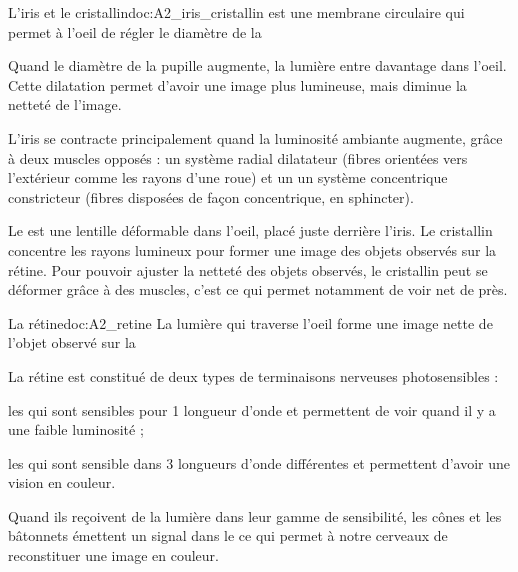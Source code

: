 


\begin{doc}{L'iris et le cristallin}{doc:A2_iris_cristallin}
   est une membrane circulaire qui permet à l'oeil de régler le diamètre de la  
  
  Quand le diamètre de la pupille augmente, la lumière entre davantage dans l'oeil.
  Cette dilatation permet d'avoir une image plus lumineuse, mais diminue la netteté de l'image.

  L'iris se contracte principalement quand la luminosité ambiante augmente, grâce à deux muscles opposés : un système radial dilatateur (fibres orientées vers l'extérieur comme les rayons d'une roue) et un un système concentrique constricteur (fibres disposées de façon concentrique, en sphincter).

  Le  est une lentille déformable dans l'oeil, placé juste derrière l'iris.
  Le cristallin concentre les rayons lumineux pour former une image des objets observés sur la rétine.
  Pour pouvoir ajuster la netteté des objets observés, le cristallin peut se déformer grâce à des muscles, c'est ce qui permet notamment de voir net de près.
\end{doc}



\begin{doc}{La rétine}{doc:A2_retine}
  La lumière qui traverse l'oeil forme une image nette de l'objet observé sur la 

  
  La rétine est constitué de deux types de terminaisons nerveuses photosensibles :
  \begin{listePoints}
    \item les  qui sont sensibles pour 1 longueur d'onde et permettent de voir quand il y a une faible luminosité ;
    \item les  qui sont sensible dans 3 longueurs d'onde différentes et permettent d'avoir une vision en couleur.
  \end{listePoints}
  Quand ils reçoivent de la lumière dans leur gamme de sensibilité, les cônes et les bâtonnets émettent un signal dans le  ce qui permet à notre cerveaux de reconstituer une image en couleur.
\end{doc}


